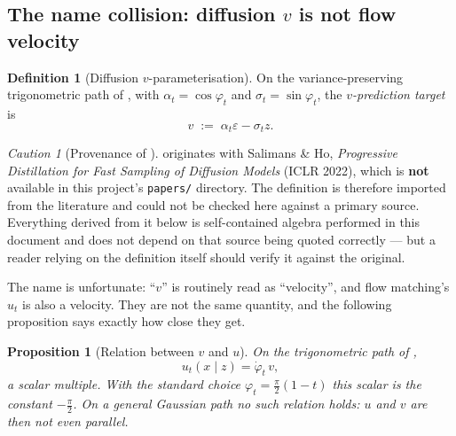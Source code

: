 \documentclass[11pt,a4paper]{report}
\newtheorem{proposition}[proposition]{Proposition}
\theoremstyle{definition}
\newtheorem{definition}[definition]{Definition}
\theoremstyle{remark}
\newtheorem{caution}[caution]{Caution}
\newcommand{\file}[1]{\texttt{#1}}
\begin{document}
\subsection{The name collision: diffusion $v$ is not flow velocity}

\begin{definition}[Diffusion $v$-parameterisation]
\label{def:diffusion-v}
On the variance-preserving trigonometric path of ,
with $\alpha_t=\cos\varphi_t$ and $\sigma_t=\sin\varphi_t$, the
\emph{$v$-prediction target} is
\begin{equation}
\label{eq:def-v}
v \;:=\; \alpha_t\varepsilon - \sigma_t z .
\end{equation}
\end{definition}

\begin{caution}[Provenance of ]
\label{caution:v-source}
 originates with Salimans \& Ho, \emph{Progressive
Distillation for Fast Sampling of Diffusion Models} (ICLR 2022), which is
\textbf{not} available in this project's \file{papers/} directory. The
definition is therefore imported from the literature and could not be
checked here against a primary source. Everything derived from it below is
self-contained algebra performed in this document and does not depend on
that source being quoted correctly --- but a reader relying on the
definition itself should verify it against the original.
\end{caution}

The name is unfortunate: ``$v$'' is routinely read as ``velocity'', and
flow matching's $u_t$ is also a velocity. They are not the same quantity,
and the following proposition says exactly how close they get.

\begin{proposition}[Relation between $v$ and $u$]
\label{prop:v-vs-u}
On the trigonometric path of ,
\begin{equation}
\label{eq:v-vs-u}
u_t(x\mid z) = \dot\varphi_t\,v ,
\end{equation}
a \emph{scalar} multiple. With the standard choice
$\varphi_t=\tfrac\pi2(1-t)$ this scalar is the constant $-\tfrac\pi2$. On a
general Gaussian path no such relation holds: $u$ and $v$ are then not even
parallel.
\end{proposition}
\end{document}
